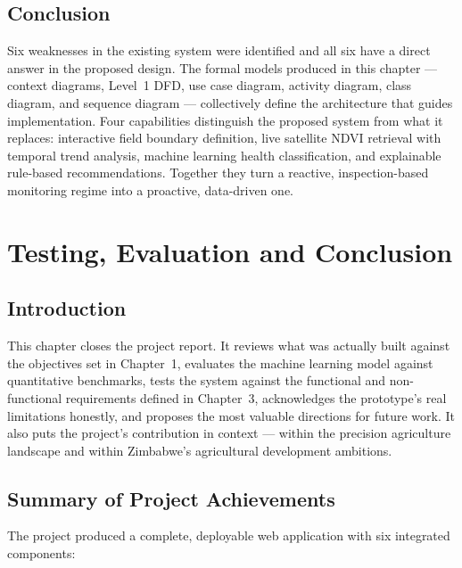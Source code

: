\documentclass[12pt,a4paper]{report}
\begin{document}
\section{Conclusion}

Six weaknesses in the existing system were identified and all six have a direct answer in the proposed design. The formal models produced in this chapter — context diagrams, Level~1 DFD, use case diagram, activity diagram, class diagram, and sequence diagram — collectively define the architecture that guides implementation. Four capabilities distinguish the proposed system from what it replaces: interactive field boundary definition, live satellite NDVI retrieval with temporal trend analysis, machine learning health classification, and explainable rule-based recommendations. Together they turn a reactive, inspection-based monitoring regime into a proactive, data-driven one.



\chapter{Testing, Evaluation and Conclusion}

\section{Introduction}

This chapter closes the project report. It reviews what was actually built against the objectives set in Chapter~1, evaluates the machine learning model against quantitative benchmarks, tests the system against the functional and non-functional requirements defined in Chapter~3, acknowledges the prototype's real limitations honestly, and proposes the most valuable directions for future work. It also puts the project's contribution in context — within the precision agriculture landscape and within Zimbabwe's agricultural development ambitions.

\section{Summary of Project Achievements}

The project produced a complete, deployable web application with six integrated components:
\end{document}
